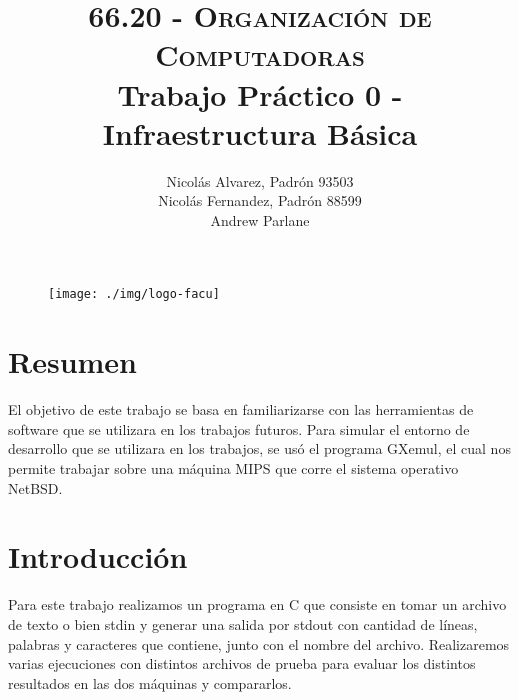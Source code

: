 \documentclass[a4paper]{article}
\begin{document}
\begin{figure}
\centering
\texttt{[image: ./img/logo-facu]}
\end{figure}

\title{\large\textsc{66.20 - Organización de Computadoras}\\
\large Trabajo Práctico 0 - Infraestructura Básica}

\author{
Nicolás Alvarez, Padrón 93503\\
Nicolás Fernandez, Padrón 88599\\
Andrew Parlane \hspace{2cm} \\
}

\maketitle

\newpage

\tableofcontents

\newpage

\section{Resumen}
El objetivo de este trabajo se basa en familiarizarse con las herramientas de software que se utilizara en los trabajos futuros. Para simular el entorno de desarrollo que se utilizara en los trabajos, se usó el programa GXemul, el cual nos permite trabajar sobre una máquina MIPS que corre el sistema operativo NetBSD.

\section{Introducción}
Para este trabajo realizamos un programa en C que consiste en tomar un archivo de texto o bien stdin y generar una salida por stdout con cantidad de líneas, palabras y caracteres que contiene, junto con el nombre del archivo.
Realizaremos varias ejecuciones con distintos archivos de prueba para evaluar los distintos resultados en las dos máquinas y compararlos.
\end{document}
